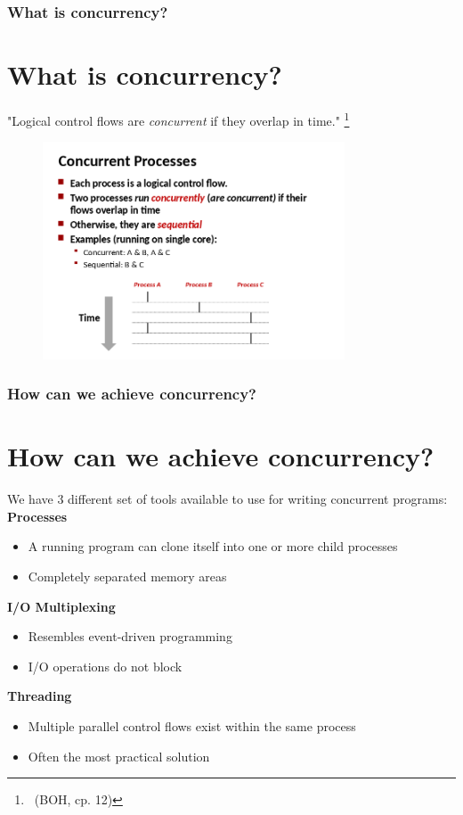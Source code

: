 \documentclass[xcolor={usenames,dvipsnames}]{beamer}
\begin{document}
%
%
%
\begin{frame}
\frametitle{What is concurrency?}
\section{What is concurrency?}

"Logical control flows are \textit{concurrent} if they overlap in time."
\footnote{\ (BOH, cp. 12)\vspace{2mm}}

\begin{figure}
\includegraphics[width=0.8\textwidth]{images/concurrent-processes.png}
\end{figure}
\end{frame}



%
%
%
\begin{frame}
\frametitle{How can we achieve concurrency?}
\section{How can we achieve concurrency?}
We have 3 different set of tools available to use for writing
concurrent programs:\\
\vspace{3mm}
\textbf{Processes}
\begin{itemize}
\item A running program can clone itself into one or more child processes
\item Completely separated memory areas
\end{itemize}
\vspace{2mm}

\textbf{I/O Multiplexing}
\begin{itemize}
\item Resembles event-driven programming
\item I/O operations do not block
\end{itemize}
\vspace{2mm}

\textbf{Threading}
\begin{itemize}
\item Multiple parallel control flows exist within the same process
\item Often the most practical solution
\end{itemize}
\end{frame}
\end{document}
